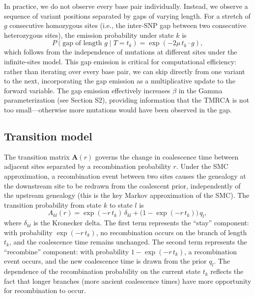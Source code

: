 \documentclass[10pt,letterpaper]{article}
\begin{document}
In practice, we do not observe every base pair individually. Instead, we observe a sequence of variant positions separated by gaps of varying length. For a stretch of $g$ consecutive homozygous sites (i.e., the inter-SNP gap between two consecutive heterozygous sites), the emission probability under state $k$ is
\begin{equation}
P(\text{gap of length } g \mid T = t_k) = \exp(-2\mu\, t_k \cdot g),
\label{eq:emission_gap}
\end{equation}
which follows from the independence of mutations at different sites under the infinite-sites model. This gap emission is critical for computational efficiency: rather than iterating over every base pair, we can skip directly from one variant to the next, incorporating the gap emission as a multiplicative update to the forward variable. The gap emission effectively increases $\beta$ in the Gamma parameterization (see Section S2), providing information that the TMRCA is not too small---otherwise more mutations would have been observed in the gap.

\subsection{Transition model}

The transition matrix $\mathbf{A}(r)$ governs the change in coalescence time between adjacent sites separated by a recombination probability $r$. Under the SMC approximation, a recombination event between two sites causes the genealogy at the downstream site to be redrawn from the coalescent prior, independently of the upstream genealogy (this is the key Markov approximation of the SMC). The transition probability from state $k$ to state $l$ is
\begin{equation}
A_{kl}(r) = \exp(-r\, t_k)\, \delta_{kl} + \bigl(1 - \exp(-r\, t_k)\bigr)\, q_l,
\label{eq:transition}
\end{equation}
where $\delta_{kl}$ is the Kronecker delta. The first term represents the ``stay'' component: with probability $\exp(-r\, t_k)$, no recombination occurs on the branch of length $t_k$, and the coalescence time remains unchanged. The second term represents the ``recombine'' component: with probability $1 - \exp(-r\, t_k)$, a recombination event occurs, and the new coalescence time is drawn from the prior $q_l$. The dependence of the recombination probability on the current state $t_k$ reflects the fact that longer branches (more ancient coalescence times) have more opportunity for recombination to occur.
\end{document}
